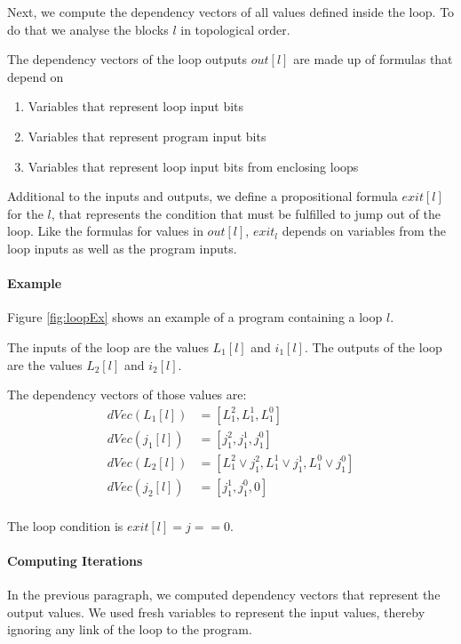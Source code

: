 Next, we compute the dependency vectors of all values defined inside the loop. To do that we analyse the blocks $l$ in topological order.

The dependency vectors of the loop outputs $out[l]$ are made up of formulas that depend on
\begin{enumerate}
    \setlength\itemsep{0em}
    \item Variables that represent loop input bits
    \item Variables that represent program input bits
    \item Variables that represent loop input bits from enclosing loops
\end{enumerate}

Additional to the inputs and outputs, we define a propositional formula $exit[l]$ for the $l$, that represents the condition that must be fulfilled to jump out of the loop. Like the formulas for values in $out[l]$, $exit_l$ depends on variables from the loop inputs as well as the program inputs. 

\paragraph{Example}
Figure \ref{fig:loopEx} shows an example of a program containing a loop $l$.

The inputs of the loop are the values $L_1[l]$ and $i_1[l]$. The outputs of the loop are the values $L_2[l]$ and $i_2[l]$.

The dependency vectors of those values are:
\begin{align*}
    dVec(L_1[l]) &= [L_1^2, L_1^1, L_1^0] \\
    dVec(j_1[l]) &= [j_1^2, j_1^1, j_1^0] \\
    dVec(L_2[l]) &= [L_1^2 \lor j_1^2, L_1^1 \lor j_1^1, L_1^0 \lor j_1^0] \\
    dVec(j_2[l]) &= [j_1^1, j_1^0, 0] \\
\end{align*}

The loop condition is $exit[l] = j == 0$.

\paragraph{Computing Iterations}
In the previous paragraph, we computed dependency vectors that represent the output values. We used fresh variables to represent the input values, thereby ignoring any link of the loop to the program.

